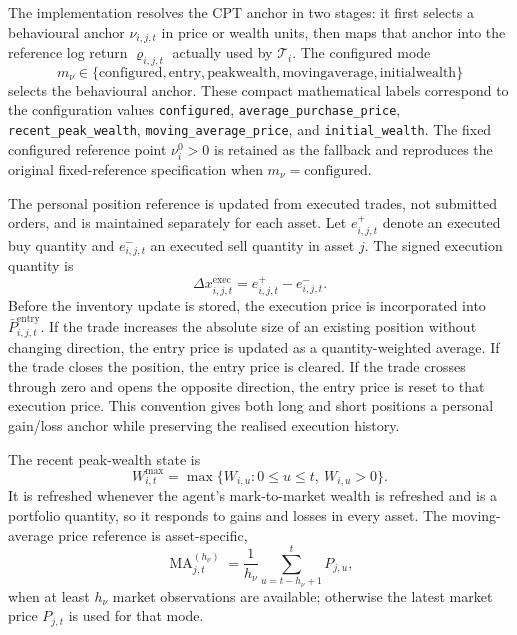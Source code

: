 \documentclass[12pt, a4paper]{article}
\DeclareMathOperator{\MA}{MA}
\begin{document}
    The implementation resolves the CPT anchor in two stages: it first selects a
    behavioural anchor \(\nu_{i,j,t}\) in price or wealth units, then maps that
    anchor into the reference log return \(\varrho_{i,j,t}\) actually used by
    \(\mathcal{T}_i\). The configured mode
    \[
        m_{\nu}\in\{
        \mathrm{configured},
        \mathrm{entry},
        \mathrm{peakwealth},
        \mathrm{movingaverage},
        \mathrm{initialwealth}
        \}
    \]
    selects the behavioural anchor. These compact mathematical labels correspond
    to the configuration values \texttt{configured},
    \texttt{average\_purchase\_price}, \texttt{recent\_peak\_wealth},
    \texttt{moving\_average\_price}, and \texttt{initial\_wealth}. The fixed
    configured reference point \(\nu_i^0>0\) is retained as the fallback and
    reproduces the original fixed-reference specification when
    \(m_{\nu}=\mathrm{configured}\).

    The personal position reference is updated from executed trades, not submitted
    orders, and is maintained separately for each asset. Let \(e_{i,j,t}^{+}\)
    denote an executed buy quantity and \(e_{i,j,t}^{-}\) an executed sell quantity
    in asset \(j\). The signed execution quantity is
    \[
        \Delta x_{i,j,t}^{\mathrm{exec}}=e_{i,j,t}^{+}-e_{i,j,t}^{-}.
    \]
    Before the inventory update is stored, the execution price is incorporated into
    \(\bar P_{i,j,t}^{\text{entry}}\). If the trade increases the absolute size of an
    existing position without changing direction, the entry price is updated as a
    quantity-weighted average. If the trade closes the position, the entry price is
    cleared. If the trade crosses through zero and opens the opposite direction,
    the entry price is reset to that execution price. This convention gives both
    long and short positions a personal gain/loss anchor while preserving the
    realised execution history.

    The recent peak-wealth state is
    \[
        W_{i,t}^{\max}
        =\max\{W_{i,u}:0\le u\le t,\ W_{i,u}>0\}.
    \]
    It is refreshed whenever the agent's mark-to-market wealth is refreshed and is
    a portfolio quantity, so it responds to gains and losses in every asset. The
    moving-average price reference is asset-specific,
    \[
        \MA_{j,t}^{(h_{\nu})}
        =
        \frac{1}{h_{\nu}}\sum_{u=t-h_{\nu}+1}^{t}P_{j,u},
    \]
    when at least \(h_{\nu}\) market observations are available; otherwise the
    latest market price \(P_{j,t}\) is used for that mode.
\end{document}
